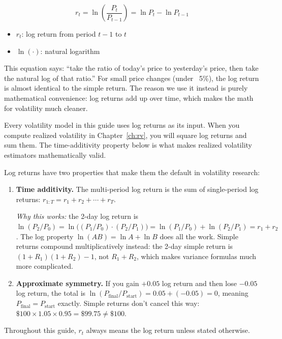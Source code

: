 \begin{equation}
  r_t = \ln\!\left(\frac{P_t}{P_{t-1}}\right) = \ln P_t - \ln P_{t-1}
  \label{eq:log-return}
\end{equation}
\begin{itemize}[nosep]
  \item $r_t$: log return from period $t-1$ to $t$
  \item $\ln(\cdot)$: natural logarithm
\end{itemize}

\begin{intuition}
This equation says: ``take the ratio of today's price to yesterday's price, then take the natural log of that ratio.''
For small price changes (under ~5\%), the log return is almost identical to the simple return.
The reason we use it instead is purely mathematical convenience: log returns add up over time, which makes the math for volatility much cleaner.
\end{intuition}

\begin{projectconnection}
Every volatility model in this guide uses log returns as its input.
When you compute realized volatility in Chapter~\ref{ch:rv}, you will square log returns and sum them.
The time-additivity property below is what makes realized volatility estimators mathematically valid.
\end{projectconnection}

\begin{keyidea}
Log returns have two properties that make them the default in volatility research:
\begin{enumerate}[nosep]
  \item \textbf{Time additivity.}
  The multi-period log return is the sum of single-period log returns:
  $r_{1:T} = r_1 + r_2 + \cdots + r_T$.

  \emph{Why this works:} the 2-day log return is $\ln(P_2/P_0) = \ln\bigl((P_1/P_0)\cdot(P_2/P_1)\bigr) = \ln(P_1/P_0) + \ln(P_2/P_1) = r_1 + r_2$.
  The log property $\ln(AB) = \ln A + \ln B$ does all the work.
  Simple returns compound multiplicatively instead: the 2-day simple return is $(1+R_1)(1+R_2) - 1$, not $R_1 + R_2$, which makes variance formulas much more complicated.

  \item \textbf{Approximate symmetry.}
  If you gain $+0.05$ log return and then lose $-0.05$ log return, the total is $\ln(P_{\text{final}}/P_{\text{start}}) = 0.05 + (-0.05) = 0$, meaning $P_{\text{final}} = P_{\text{start}}$ exactly.
  Simple returns don't cancel this way: $\$100 \times 1.05 \times 0.95 = \$99.75 \neq \$100$.
\end{enumerate}
Throughout this guide, $r_t$ always means the log return unless stated otherwise.
\end{keyidea}

